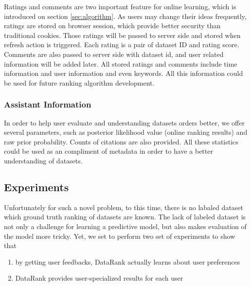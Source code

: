 \documentclass[twoside,11pt]{article}
\begin{document}
        Ratings and comments are two important feature for online learning, which is introduced on section \ref{sec:algorithm}. As users may change their ideas frequently, ratings are stored on browser session, which provide better security than traditional cookies. Those ratings will be passed to server side and stored when refresh action is triggered. Each rating is a pair of dataset ID and rating score. Comments are also passed to server side with dataset id, and user related information will be added later. All stored ratings and comments include time information and user information and even keywords. All this information could be used for future ranking algorithm development.


    \subsubsection{Assistant Information} %
    \label{ssub:assistant_information}
    
        In order to help user evaluate and understanding datasets orders better, we offer several parameters, such as posterior likelihood value (online ranking results) and raw prior probability. Counts of citations are also provided. All these statistics could be used as an compliment of metadata in order to have a better understanding of datasets.
\subsection{Experiments}
Unfortunately for such a novel problem, to this time, there is no labaled dataset which ground truth ranking of datasets are known. The lack of labeled dataset is not only a challenge for learning a predictive model, but also makes evaluation of the model more tricky. Yet, we set to perform two set of experiments to show that
\begin{enumerate}
\item by getting user feedbacks, DataRank actually learns about user preferences  
\item DataRank provides user-specialized results for each user
\end{enumerate}
\end{document}
